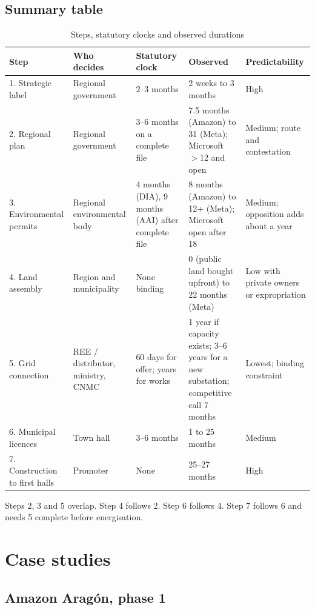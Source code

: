 \documentclass[11pt]{article}
\begin{document}
\subsection{Summary table}

\begin{table}[H]
\centering\small
\caption{Steps, statutory clocks and observed durations}
\label{tab:steps}
\begin{tabular}{p{2.4cm}p{2.4cm}p{2.7cm}p{3.9cm}p{2.4cm}}
\toprule
Step & Who decides & Statutory clock & Observed & Predictability \\
\midrule
1. Strategic label & Regional government & 2--3 months & 2 weeks to 3 months & High \\
2. Regional plan & Regional government & 3--6 months on a complete file & 7.5 months (Amazon) to 31 (Meta); Microsoft $>$12 and open & Medium; route and contestation \\
3. Environmental permits & Regional environmental body & 4 months (DIA), 9 months (AAI) after complete file & 8 months (Amazon) to 12+ (Meta); Microsoft open after 18 & Medium; opposition adds about a year \\
4. Land assembly & Region and municipality & None binding & 0 (public land bought upfront) to 22 months (Meta) & Low with private owners or expropriation \\
5. Grid connection & REE / distributor, ministry, CNMC & 60 days for offer; years for works & 1 year if capacity exists; 3--6 years for a new substation; competitive call 7 months & Lowest; binding constraint \\
6. Municipal licences & Town hall & 3--6 months & 1 to 25 months & Medium \\
7. Construction to first halls & Promoter & None & 25--27 months & High \\
\bottomrule
\end{tabular}
\end{table}

Steps 2, 3 and 5 overlap. Step 4 follows 2. Step 6 follows 4. Step 7 follows 6 and needs 5 complete before energisation.

\section{Case studies}

\subsection{Amazon Aragón, phase 1}
\end{document}
